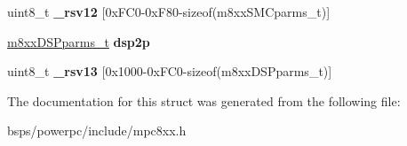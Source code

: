 \begin{DoxyCompactItemize}
\item 
\mbox{\label{structm8xx___ae6f50758cb8d6c96ec71f5cf11c28699}} 
uint8\+\_\+t {\bfseries \+\_\+rsv12} \mbox{[}0x\+F\+C0-\/0x\+F80-\/sizeof(m8xx\+S\+M\+Cparms\+\_\+t)\mbox{]}
\item 
\mbox{\label{structm8xx___a5b7409fe0ae1357e7661eba128232c3a}} 
\mbox{\hyperlink{structm8xxDSPparms__}{m8xx\+D\+S\+Pparms\+\_\+t}} {\bfseries dsp2p}
\item 
\mbox{\label{structm8xx___ab90e6de61019a47ed00905df593cbb67}} 
uint8\+\_\+t {\bfseries \+\_\+rsv13} \mbox{[}0x1000-\/0x\+F\+C0-\/sizeof(m8xx\+D\+S\+Pparms\+\_\+t)\mbox{]}
\end{DoxyCompactItemize}


The documentation for this struct was generated from the following file\+:\begin{DoxyCompactItemize}
\item 
bsps/powerpc/include/mpc8xx.\+h\end{DoxyCompactItemize}
